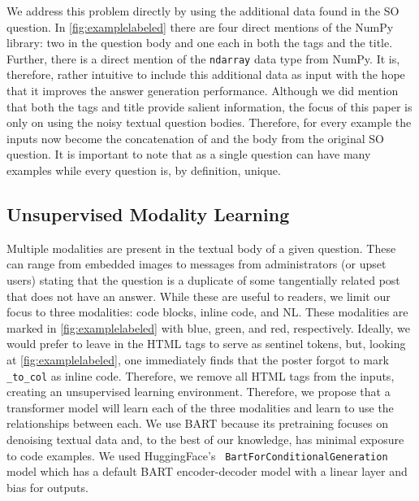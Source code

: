 \documentclass[11pt]{article}
\newcommand{\codesnip}[1]{\small\texttt{#1}\normalsize}
\begin{document}
\indent We address this problem directly by using the additional data found in the SO question. In \autoref{fig:examplelabeled} there are four direct mentions of the NumPy library: two in the question body and one each in both the tags and the title. Further, there is a direct mention of the \codesnip{ndarray} data type from NumPy. It is, therefore, rather intuitive to include this additional data as input with the hope that it improves the answer generation performance. Although we did mention that both the tags and title provide salient information, the focus of this paper is only on using the noisy textual question bodies. Therefore, for every example  the inputs now become the concatenation of  and the body  from the original SO question. It is important to note that  as a single question can have many examples while every question is, by definition, unique.

\subsection{Unsupervised Modality Learning}\label{subsec:unsupermodal}
 Multiple modalities are present in the textual body of a given question. These can range from embedded images to messages from administrators (or upset users) stating that the question is a duplicate of some tangentially related post that does not have an answer. While these are useful to readers, we limit our focus to three modalities: code blocks, inline code, and NL. These modalities are marked in \autoref{fig:examplelabeled} with blue, green, and red, respectively. Ideally, we would prefer to leave in the HTML tags to serve as sentinel tokens, but, looking at \autoref{fig:examplelabeled}, one immediately finds that the poster forgot to mark \codesnip{\_to\_col} as inline code. Therefore, we remove all HTML tags from the inputs, creating an unsupervised learning environment. Therefore, we propose that a transformer model will learn each of the three modalities and learn to use the relationships between each. We use BART\citep{lewis-etal-2020-bart} because its pretraining focuses on denoising textual data and, to the best of our knowledge, has minimal exposure to code examples. We used HuggingFace's~\citep{wolf-etal-2020-transformers} \codesnip{BartForConditionalGeneration} model which has a default BART encoder-decoder model with a linear layer and bias for outputs.  
\end{document}
